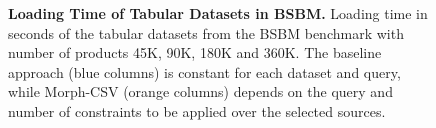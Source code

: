 \begin{figure}[th]
  \centering
  \qquad
\caption[Loading Time of Tabular Datasets in BSBM.]{\textbf{Loading Time of Tabular Datasets in BSBM.} Loading time in seconds of the tabular datasets from the BSBM benchmark with number of products 45K, 90K, 180K and 360K. The baseline approach (blue columns) is constant for each dataset and query, while Morph-CSV (orange columns) depends on the query and number of constraints to be applied over the selected sources.}
\label{fig:bsbmload}
\end{figure}


